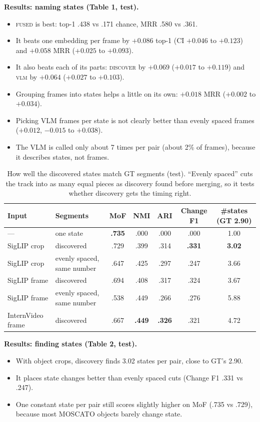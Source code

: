 \documentclass[10pt]{article}
\begin{document}
\textbf{Results: naming states (Table 1, test).}
\begin{itemize}
\item \textsc{fused} is best: top-1 .438 vs .171 chance, MRR .580 vs .361.
\item It beats one embedding per frame by $+0.086$ top-1 (CI $+0.046$ to $+0.123$) and $+0.058$ MRR
($+0.025$ to $+0.093$).
\item It also beats each of its parts: \textsc{discover} by $+0.069$ ($+0.017$ to $+0.119$) and \textsc{vlm}
by $+0.064$ ($+0.027$ to $+0.103$).
\item Grouping frames into states helps a little on its own: $+0.018$ MRR ($+0.002$ to $+0.034$).
\item Picking VLM frames per state is not clearly better than evenly spaced frames ($+0.012$, $-0.015$ to
$+0.038$).
\item The VLM is called only about 7 times per pair (about 2\% of frames), because it describes states, not
frames.
\end{itemize}

\begin{table}[h]\centering\small
\begin{tabular}{llccccc}
\toprule
Input & Segments & MoF & NMI & ARI & Change F1 & \#states (GT 2.90)\\
\midrule
--- & one state & \textbf{.735} & .000 & .000 & .000 & 1.00\\
SigLIP crop & discovered & .729 & .399 & .314 & \textbf{.331} & \textbf{3.02}\\
SigLIP crop & evenly spaced, same number & .647 & .425 & .297 & .247 & 3.66\\
SigLIP frame & discovered & .694 & .408 & .317 & .324 & 3.67\\
SigLIP frame & evenly spaced, same number & .538 & .449 & .266 & .276 & 5.88\\
InternVideo frame & discovered & .667 & \textbf{.449} & \textbf{.326} & .321 & 4.72\\
\bottomrule
\end{tabular}
\caption{How well the discovered states match GT segments (test). ``Evenly spaced'' cuts the track into as
many equal pieces as discovery found before merging, so it tests whether discovery gets the timing right.}
\end{table}

\textbf{Results: finding states (Table 2, test).}
\begin{itemize}
\item With object crops, discovery finds 3.02 states per pair, close to GT's 2.90.
\item It places state changes better than evenly spaced cuts (Change F1 .331 vs .247).
\item One constant state per pair still scores slightly higher on MoF (.735 vs .729), because most MOSCATO
objects barely change state.
\end{itemize}
\end{document}
